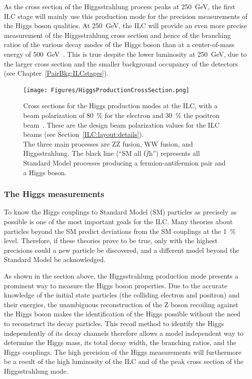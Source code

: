 As the cross section of the Higgsstrahlung process peaks at \SI{250}{\GeV}, the first ILC stage will mainly use this production mode for the precision measurements of the Higgs boson qualities.
At \SI{250}{\GeV}, the ILC will provide an even more precise measurement of the Higgsstrahlung cross section and hence of the branching ratios of the various decay modes of the Higgs boson than at a center-of-mass energy of \SI{500}{\GeV}~\cite[p. 14]{PhysicsCase}.
This is true despite the lower luminosity at \SI{250}{\GeV}, due to the larger cross section and the smaller background occupancy of the detectors (see Chapter~\ref{PairBkg:ILCstages}).

\begin{figure}[!h]
\centering
\texttt{[image: Figures/HiggsProductionCrossSection.png]}
\caption[Cross sections for the Higgs production modes at ILC as a function of $\sqrt{\rm{s}}$]{Cross sections for the Higgs production modes at the ILC, with a beam polarization of \SI[detect-all]{80}{\percent} for the electron and \SI[detect-all]{30}{\percent} the positron beam~\cite[p. 13]{PhysicsCase}.
These are the design beam polarization values for the ILC beams (see Section~\ref{ILC:layout:details}).
\\The three main processes are ZZ fusion, WW fusion, and Higgsstrahlung.
The black line (``SM all f$\bar{f}$h'') represents all Standard Model processes producing a fermion-antifermion pair and a Higgs boson.  
}
\label{fig:HiggsProduction}
\end{figure}

\subsubsection{The Higgs measurements}
To know the Higgs couplings to Standard Model (SM) particles as precisely as possible is one of the most important goals for the ILC.
Many theories about particles beyond the SM predict deviations from the SM couplings at the \SI{1}{\percent} level.
Therefore, if these theories prove to be true, only with the highest precisions could a new particle be discovered, and a different model beyond the Standard Model be acknowledged.

As shown in the section above, the Higgsstrahlung production mode presents a prominent way to measure the Higgs boson properties.
Due to the accurate knowledge of the initial state particles (the colliding electron and positron) and their energies, the unambiguous reconstruction of the Z boson recoiling against the Higgs boson makes the identification of the Higgs possible without the need to reconstruct its decay particles.
This recoil method to identify the Higgs independently of its decay channels therefore allows a model independent way to determine the Higgs mass, its total decay width, the branching ratios, and the Higgs couplings. 
The high precision of the Higgs measurements will furthermore be a result of the high luminosity of the ILC and of the peak cross section of the Higgsstrahlung mode.


